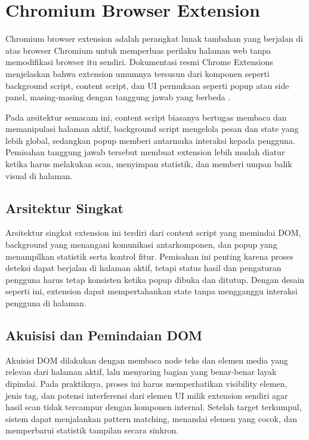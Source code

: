 \section{Chromium Browser Extension}

Chromium browser extension adalah perangkat lunak tambahan yang berjalan di atas browser Chromium untuk memperluas perilaku halaman web tanpa memodifikasi browser itu sendiri. Dokumentasi resmi Chrome Extensions menjelaskan bahwa extension umumnya tersusun dari komponen seperti background script, content script, dan UI permukaan seperti popup atau side panel, masing-masing dengan tanggung jawab yang berbeda \cite{chromeextdocs}.

Pada arsitektur semacam ini, content script biasanya bertugas membaca dan memanipulasi halaman aktif, background script mengelola pesan dan state yang lebih global, sedangkan popup memberi antarmuka interaksi kepada pengguna. Pemisahan tanggung jawab tersebut membuat extension lebih mudah diatur ketika harus melakukan scan, menyimpan statistik, dan memberi umpan balik visual di halaman.

\subsection{Arsitektur Singkat}

Arsitektur singkat extension ini terdiri dari content script yang memindai DOM, background yang menangani komunikasi antarkomponen, dan popup yang menampilkan statistik serta kontrol fitur. Pemisahan ini penting karena proses deteksi dapat berjalan di halaman aktif, tetapi status hasil dan pengaturan pengguna harus tetap konsisten ketika popup dibuka dan ditutup. Dengan desain seperti ini, extension dapat mempertahankan state tanpa mengganggu interaksi pengguna di halaman.

\subsection{Akuisisi dan Pemindaian DOM}

Akuisisi DOM dilakukan dengan membaca node teks dan elemen media yang relevan dari halaman aktif, lalu menyaring bagian yang benar-benar layak dipindai. Pada praktiknya, proses ini harus memperhatikan visibility elemen, jenis tag, dan potensi interferensi dari elemen UI milik extension sendiri agar hasil scan tidak tercampur dengan komponen internal. Setelah target terkumpul, sistem dapat menjalankan pattern matching, menandai elemen yang cocok, dan memperbarui statistik tampilan secara sinkron.
